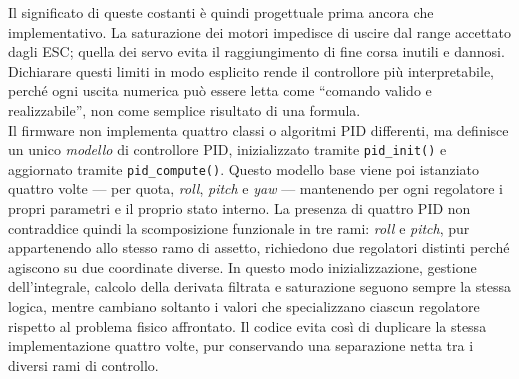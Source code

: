 \documentclass[11pt]{report}
\begin{document}
	Il significato di queste costanti è quindi progettuale prima ancora che implementativo. La saturazione dei motori impedisce di uscire dal range accettato dagli ESC; quella dei servo evita il raggiungimento di fine corsa inutili e dannosi. Dichiarare questi limiti in modo esplicito rende il controllore più interpretabile, perché ogni uscita numerica può essere letta come ``comando valido e realizzabile'', non come semplice risultato di una formula.\\
	Il firmware non implementa quattro classi o algoritmi PID differenti, ma definisce un unico \textit{modello} di controllore PID, inizializzato tramite \texttt{pid\_init()} e aggiornato tramite \texttt{pid\_compute()}. Questo modello base viene poi istanziato quattro volte --- per quota, \textit{roll}, \textit{pitch} e \textit{yaw} --- mantenendo per ogni regolatore i propri parametri e il proprio stato interno. La presenza di quattro PID non contraddice quindi la scomposizione funzionale in tre rami: \textit{roll} e \textit{pitch}, pur appartenendo allo stesso ramo di assetto, richiedono due regolatori distinti perché agiscono su due coordinate diverse. In questo modo inizializzazione, gestione dell'integrale, calcolo della derivata filtrata e saturazione seguono sempre la stessa logica, mentre cambiano soltanto i valori che specializzano ciascun regolatore rispetto al problema fisico affrontato. Il codice evita cos\`i di duplicare la stessa implementazione quattro volte, pur conservando una separazione netta tra i diversi rami di controllo.
	
	
	
\end{document}
